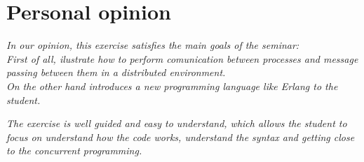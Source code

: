 \section{Personal opinion}

\textit{In our opinion, this exercise satisfies the main goals of the seminar:\\
First of all, ilustrate how to perform comunication between processes and message passing between them in a distributed environment.\\
On the other hand introduces a new programming language like Erlang to the student.\\}

\textit{The exercise is well guided and easy to understand, which allows the student to focus on understand how the code works, understand the syntax and getting close to the concurrent programming.}

